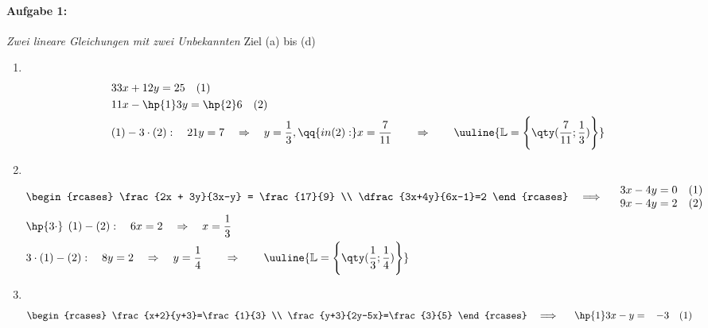 \paragraph{Aufgabe 1: } \emph{Zwei lineare Gleichungen mit zwei Unbekannten} \hfill Ziel (a) bis (d)\\[0.2cm]
\begin{enumerate}[label=(\alph*)]
    \item $~$\\[-1.45 cm]\begin{align}
        &33x+12y=25 \quad (1) \\ 
        &11x-\hp{1}3y=\hp{2}6 \quad (2) \\
        &(1) - 3\cdot (2): \quad 21y = 7 \quad\Rightarrow \quad y = \frac{1}{3}, \qq{in (2):} x = \frac{7}{11} \qquad \Rightarrow \qquad \uuline{\mathbb{L} = \Bigg\{\qty(\frac{7}{11};\frac{1}{3})\Bigg\}}
    \end{align}
    \item $~$\\[-1.45cm] 
    \begin{align}
        &\begin{rcases}
            \frac{2x + 3y}{3x-y} = \frac{17}{9} \\
            \dfrac{3x+4y}{6x-1}=2
        \end{rcases} \quad \Longrightarrow \quad 
        \begin{array}{l}
            3x-4y = 0 \quad (1) \\
            9x -4y = 2 \quad (2)
        \end{array} \\
        &\hp{3\cdot}\;\,(1) -(2): \quad 6x = 2 \quad\Rightarrow\quad x = \frac{1}{3}\\
        &3\cdot(1) -(2): \quad 8y = 2 \quad\Rightarrow\quad y = \frac{1}{4} \qquad \Rightarrow \qquad \uuline{\mathbb{L} = \Bigg\{\qty(\frac{1}{3};\frac{1}{4})\Bigg\}}
    \end{align}
    \item $~$\\[-1.45cm] 
    \begin{align}
        &\begin{rcases}
            \frac{x+2}{y+3}=\frac{1}{3} \\
            \frac{y+3}{2y-5x}=\frac{3}{5}
        \end{rcases} \quad \Longrightarrow \quad 
        \begin{array}{l}
            \hp{1}3x-y = \;\;\;-3 \quad (1) \\

\end{array}
\end{align}
\end{enumerate}
